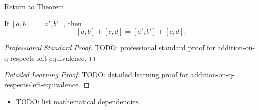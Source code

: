 \newpage
{}
\label{prf:addition-on-q-respects-left-equivalence}

\begin{remark*}[Return]
\hyperref[lem:addition-on-q-respects-left-equivalence]{Return to Theorem}
\end{remark*}

\begin{lemma*}
If $[a,b]=[a',b']$, then
\[
[a,b]+[c,d]=[a',b']+[c,d].
\]
\end{lemma*}

\begin{proof}[Professional Standard Proof]
\LRAProofBodyStart
TODO: professional standard proof for addition-on-q-respects-left-equivalence.
\end{proof}

\begin{proof}[Detailed Learning Proof]
\LRAProofBodyStart
TODO: detailed learning proof for addition-on-q-respects-left-equivalence.
\end{proof}

\begin{remark*}
\end{remark*}

\begin{dependencies}
\begin{itemize}
  \item TODO: list mathematical dependencies.
\end{itemize}
\end{dependencies}

\clearpage
